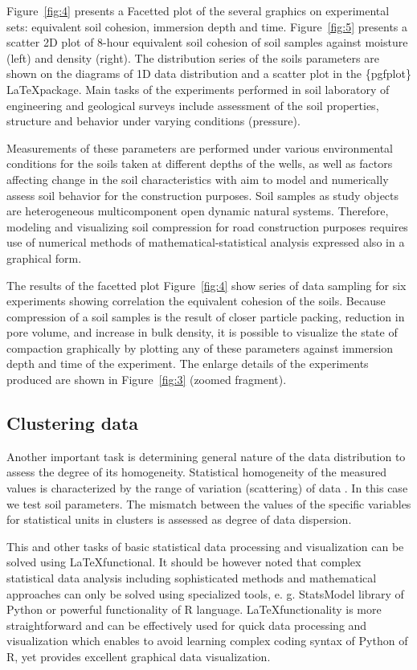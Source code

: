\documentclass[a4paper,10pt]{article}
\begin{document}
Figure~\ref{fig:4} presents a Facetted plot of the several graphics on experimental sets: equivalent soil cohesion, immersion depth and time. Figure~\ref{fig:5} presents a scatter 2D plot of 8-hour equivalent soil cohesion of soil samples against moisture (left) and density (right). The distribution series of the soils parameters are shown on the diagrams of 1D data distribution and a scatter plot in the \{pgfplot\} \LaTeX \space package. Main tasks of the experiments performed in soil laboratory of engineering and geological surveys include assessment of the soil properties, structure and behavior under varying conditions (pressure). 

Measurements of these parameters are performed under various environmental conditions for the soils taken at different depths of the wells, as well as factors affecting change in the soil characteristics with aim to model and numerically assess soil behavior for the construction purposes. Soil samples as study objects are heterogeneous multicomponent open dynamic natural systems. Therefore, modeling and visualizing soil compression for road construction purposes requires use of numerical methods of mathematical-statistical analysis expressed also in a graphical form. 

The results of the facetted plot Figure~\ref{fig:4} show series of data sampling for six experiments showing correlation the equivalent cohesion of the soils. Because compression of a soil samples is the result of closer particle packing, reduction in pore volume, and increase in bulk density, it is possible to visualize the state of compaction graphically by plotting any of these parameters against immersion depth and time of the experiment. The enlarge details of the experiments produced are shown in Figure~\ref{fig:3} (zoomed fragment).

\subsection{Clustering data}

Another important task is determining general nature of the data distribution to assess the degree of its homogeneity. Statistical homogeneity of the measured values is characterized by the range of variation (scattering) of data \cite{Pincus1951}. In this case we test soil parameters. The mismatch between the values of the specific variables for statistical units in clusters is assessed as degree of data dispersion.

This and other tasks of basic statistical data processing and visualization can be solved using \LaTeX \space functional. It should be however noted that complex statistical data analysis including sophisticated methods and mathematical approaches can only be solved using specialized tools, e. g. StatsModel library of Python or powerful functionality of R language. \LaTeX \space functionality is more straightforward and can be effectively used for quick data processing and visualization which enables to avoid learning complex coding syntax of Python of R, yet provides excellent graphical data visualization.
\end{document}
